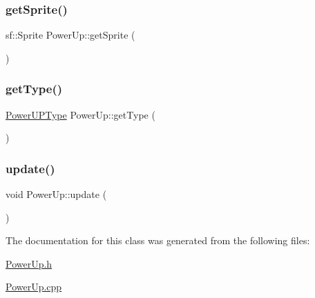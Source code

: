 \mbox{\label{class_power_up_aba820cd37629518c43f39a7bddbc12f6}} 
\subsubsection{\texorpdfstring{get\+Sprite()}{getSprite()}}
{\footnotesize\ttfamily sf\+::\+Sprite Power\+Up\+::get\+Sprite (\begin{DoxyParamCaption}{ }\end{DoxyParamCaption})}

\mbox{\label{class_power_up_a1772404047e75e3ccaeb8dd9faa20471}} 
\subsubsection{\texorpdfstring{get\+Type()}{getType()}}
{\footnotesize\ttfamily \hyperlink{_power_up_type_8h_a5508eb40af0ccc4bb1b781eaf743176c}{Power\+U\+P\+Type} Power\+Up\+::get\+Type (\begin{DoxyParamCaption}{ }\end{DoxyParamCaption})}

\mbox{\label{class_power_up_ab96271d08f69d68d022a758836f3c5cd}} 
\subsubsection{\texorpdfstring{update()}{update()}}
{\footnotesize\ttfamily void Power\+Up\+::update (\begin{DoxyParamCaption}{ }\end{DoxyParamCaption})}



The documentation for this class was generated from the following files\+:\begin{DoxyCompactItemize}
\item 
\hyperlink{_power_up_8h}{Power\+Up.\+h}\item 
\hyperlink{_power_up_8cpp}{Power\+Up.\+cpp}\end{DoxyCompactItemize}
